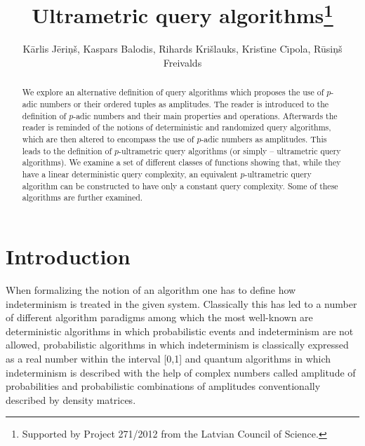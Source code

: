 \documentclass{llncs}
\begin{document}
\title{Ultrametric query algorithms\thanks{Supported by Project 271/2012 from the Latvian Council of Science.}}


\author{
K\= arlis J\= eri\c n\v s,
Kaspars Balodis,
Rihards Kri\v slauks,
Krist\= \i ne C\= \i pola,
R\= usi\c n\v s Freivalds}



\maketitle

\begin{abstract} 
We explore an alternative definition of query algorithms which proposes the use of $p$-adic numbers or their ordered tuples as amplitudes. The reader is introduced to the definition of $p$-adic numbers and their main properties and operations. Afterwards the reader is reminded of the notions of deterministic and randomized query algorithms, which are then altered to encompass the use of $p$-adic numbers as amplitudes. This leads to the definition of $p$-ultrametric query algorithms (or simply – ultrametric query algorithms). We examine a set of different classes of functions showing that, while they have a linear deterministic query complexity, an equivalent $p$-ultrametric query algorithm can be constructed to have only a constant query complexity. Some of these algorithms are further examined.
\end{abstract} 

\section{Introduction}
When formalizing the notion of an algorithm one has to define how indeterminism is treated in the given system. Classically this has led to a number of different algorithm paradigms among which the most well-known are deterministic algorithms in which probabilistic events and indeterminism are not allowed, probabilistic algorithms in which indeterminism is classically expressed as a real number within the interval [0,1] and quantum algorithms in which indeterminism is described with the help of complex numbers called amplitude of probabilities and probabilistic combinations of amplitudes conventionally described by density matrices.
\end{document}
